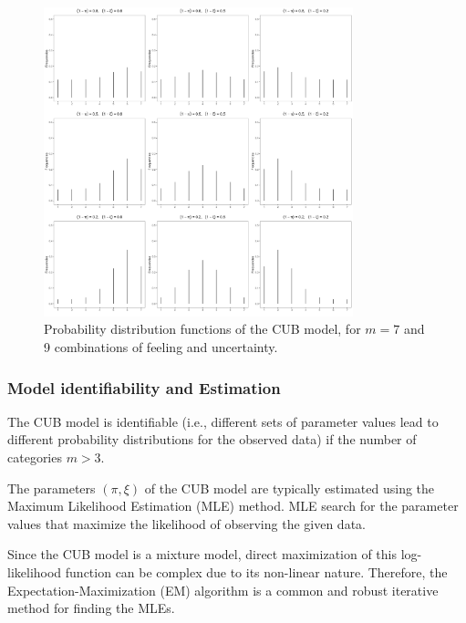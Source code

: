 \documentclass[
  letterpaper,
  DIV=11,
  numbers=noendperiod]{scrartcl}
\begin{document}
\begin{figure}

{\centering \includegraphics[width=0.8\textwidth,height=\textheight]{images/CUBgrid.jpg}

}

\caption{Probability distribution functions of the CUB model, for
\(m = 7\) and 9 combinations of feeling and uncertainty.}

\end{figure}

\hypertarget{model-identifiability-and-estimation}{%
\subsubsection{Model identifiability and
Estimation}\label{model-identifiability-and-estimation}}

The CUB model is identifiable (i.e., different sets of parameter values
lead to different probability distributions for the observed data) if
the number of categories \(m > 3\).

The parameters \((\pi, \xi)\) of the CUB model are typically estimated
using the Maximum Likelihood Estimation (MLE) method. MLE search for the
parameter values that maximize the likelihood of observing the given
data.

Since the CUB model is a mixture model, direct maximization of this
log-likelihood function can be complex due to its non-linear nature.
Therefore, the Expectation-Maximization (EM) algorithm is a common and
robust iterative method for finding the MLEs.
\end{document}
